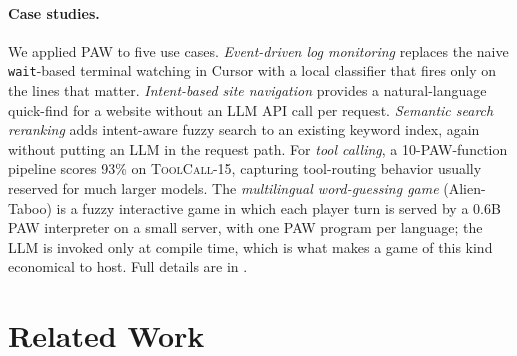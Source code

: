 \documentclass{article}
\theoremstyle{plain}
\theoremstyle{definition}
\theoremstyle{remark}
\begin{document}

\paragraph{Case studies.}
\label{sec:case_studies}
We applied PAW to five use cases. \emph{Event-driven log monitoring} replaces the naive \texttt{wait}-based terminal watching in Cursor with a local classifier that fires only on the lines that matter. \emph{Intent-based site navigation} provides a natural-language quick-find for a website without an LLM API call per request. \emph{Semantic search reranking} adds intent-aware fuzzy search to an existing keyword index, again without putting an LLM in the request path. For \emph{tool calling}, a 10-PAW-function pipeline scores 93\% on \textsc{ToolCall-15}, capturing tool-routing behavior usually reserved for much larger models. The \emph{multilingual word-guessing game} (Alien-Taboo) is a fuzzy interactive game in which each player turn is served by a 0.6B PAW interpreter on a small server, with one PAW program per language; the LLM is invoked only at compile time, which is what makes a game of this kind economical to host. Full details are in .


\section{Related Work}
\label{sec:related}
\end{document}
